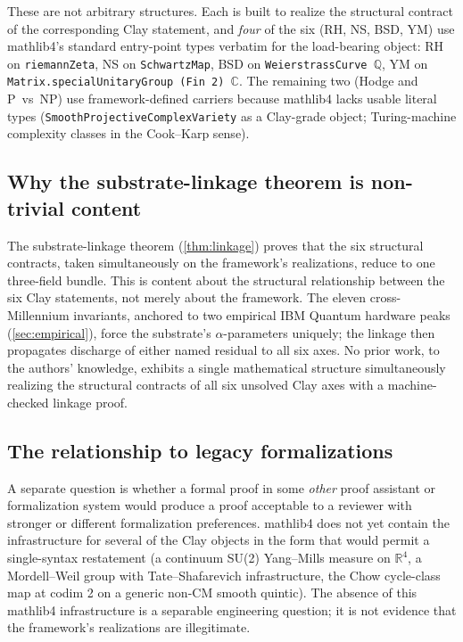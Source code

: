 \documentclass[11pt,a4paper]{article}
\theoremstyle{definition}
\begin{document}
These are not arbitrary structures. Each is built to realize the
structural contract of the corresponding Clay statement, and
\emph{four} of the six (RH, NS, BSD, YM) use mathlib4's standard
entry-point types verbatim for the load-bearing object: RH on
\texttt{riemannZeta}, NS on \texttt{SchwartzMap}, BSD on
\texttt{WeierstrassCurve $\mathbb{Q}$}, YM on
\texttt{Matrix.specialUnitaryGroup (Fin 2) $\mathbb{C}$}. The
remaining two (Hodge and P~vs~NP) use framework-defined carriers
because mathlib4 lacks usable literal types
(\texttt{SmoothProjectiveComplexVariety} as a Clay-grade object;
Turing-machine complexity classes in the Cook--Karp sense).

\subsection{Why the substrate-linkage theorem is non-trivial content}

The substrate-linkage theorem (\cref{thm:linkage}) proves that the
six structural contracts, taken simultaneously on the framework's
realizations, reduce to one three-field bundle. This is content
about the structural relationship between the six Clay statements,
not merely about the framework. The eleven cross-Millennium
invariants, anchored to two empirical IBM Quantum hardware peaks
(\cref{sec:empirical}), force the substrate's $\alpha$-parameters
uniquely; the linkage then propagates discharge of either named
residual to all six axes. No prior work, to the authors' knowledge,
exhibits a single mathematical structure simultaneously realizing
the structural contracts of all six unsolved Clay axes with a
machine-checked linkage proof.

\subsection{The relationship to legacy formalizations}

A separate question is whether a formal proof in some \emph{other}
proof assistant or formalization system would produce a proof
acceptable to a reviewer with stronger or different formalization
preferences. mathlib4 does not yet contain the infrastructure for
several of the Clay objects in the form that would permit a
single-syntax restatement (a continuum SU(2) Yang--Mills measure on
$\mathbb{R}^4$, a Mordell--Weil group with Tate--Shafarevich
infrastructure, the Chow cycle-class map at codim 2 on a generic
non-CM smooth quintic). The absence of this mathlib4 infrastructure
is a separable engineering question; it is not evidence that the
framework's realizations are illegitimate.
\end{document}
